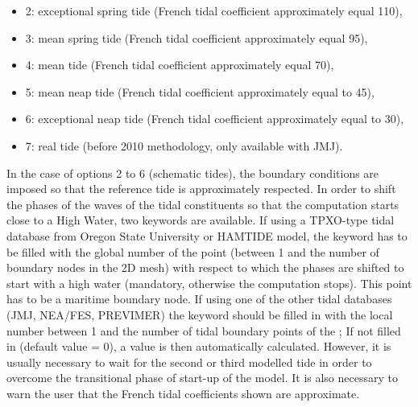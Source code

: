\begin{itemize}
\item 2: exceptional spring tide (French tidal coefficient approximately equal
110),

\item 3: mean spring tide (French tidal coefficient approximately equal 95),

\item 4: mean tide (French tidal coefficient approximately equal 70),

\item 5: mean neap tide (French tidal coefficient approximately equal to 45),

\item 6: exceptional neap tide (French tidal coefficient approximately equal
to 30),

\item 7: real tide (before 2010 methodology, only available with JMJ).
\end{itemize}

In the case of options 2 to 6 (schematic tides), the boundary conditions are
imposed so that the reference tide is approximately respected.
In order to shift the phases of the waves of the tidal constituents so that
the computation starts close to a High Water, two keywords are available.
If using a TPXO-type tidal database from Oregon State University
or HAMTIDE model, the keyword
 has to be filled
with the global number of the point (between 1 and the number of boundary
nodes in the 2D mesh) with respect to which the phases are shifted
to start with a high water (mandatory, otherwise the computation stops).
This point has to be a maritime boundary node.
If using one of the other tidal databases (JMJ, NEA/FES, PREVIMER) the keyword
 should be filled in
with the local number between 1 and the number of tidal boundary points of the
; If not filled in (default value = 0), a value
is then automatically calculated. However, it is usually necessary to
wait for the second or third modelled tide in order to overcome the
transitional phase of start-up of the model. It is also necessary to warn the
user that the French tidal coefficients shown are approximate.

